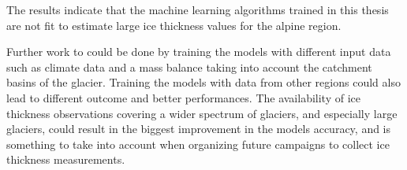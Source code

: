 The results indicate that the machine learning algorithms trained in this thesis are not fit to estimate large ice thickness values for the alpine region. 

Further work to could be done by training the models with different input data such as climate data and a mass balance taking into account the catchment basins of the glacier. Training the models with data from other regions could also lead to different outcome and better performances. The availability of ice thickness observations covering a wider spectrum of glaciers, and especially large glaciers, could result in the biggest improvement in the models accuracy, and is something to take into account when organizing future campaigns to collect ice thickness measurements. 
%
%
